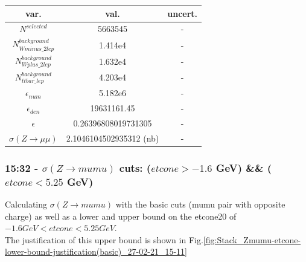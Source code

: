 \begin{tabular}{ | c | c | c |}
  \hline			
  var. & val. & uncert. \\
  \hline 
  
  $N^{selected}$ & 5663545 & - \\
  
  $N^{background}_{Wminus\_2lep}$ & 1.414e4 & - \\
  
  $N^{background}_{Wplus\_2lep}$ & 1.632e4 & - \\
  
  $N^{background}_{ttbar\_lep}$ & 4.203e4 & - \\
  
  $\epsilon_{num}$ & 5.182e6 & - \\
  
  $\epsilon_{den}$ & 19631161.45 & - \\
  \hline  
  $\epsilon$ & 0.26396808019731305 & - \\
  $\sigma(Z \rightarrow \mu\mu)$ &   2.1046104502935312 (nb) & - \\
  \hline  
\end{tabular}


\subsubsection*{15:32 - $\sigma(Z \rightarrow mumu)$ cuts: ($etcone > -1.6$ GeV) && ($etcone < 5.25$ GeV)}
Calculating $\sigma(Z \rightarrow mumu)$ with the basic cuts (mumu pair with opposite charge) as well as a lower and upper bound on the etcone20 of $-1.6 GeV < etcone < 5.25 GeV$.   
\\
The justification of this upper bound is shown in Fig.\ref{fig:Stack_Zmumu-etcone-lower-bound-justification(basic)_27-02-21_15-11}

